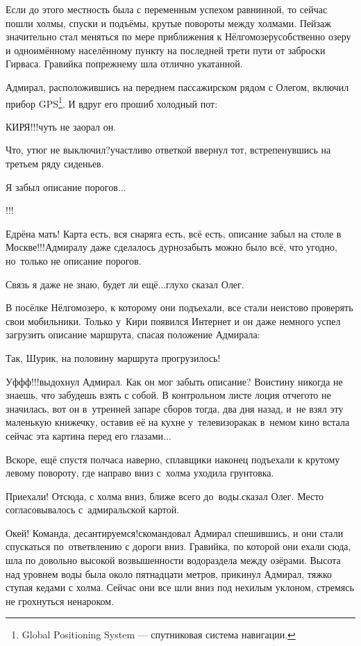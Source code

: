 Если до этого местность была с переменным успехом равнинной, то сейчас пошли холмы, спуски и подъёмы, крутые повороты между холмами. Пейзаж значительно стал меняться по мере приближения к Нёлгомозеру\mdash собственно озеру и одноимённому населённому пункту на последней трети пути от заброски Гирваса. Гравийка по\sdash прежнему шла отлично укатанной.

Адмирал, расположившись на переднем пассажирском рядом с Олегом, включил прибор GPS\footnote{Global Positioning System --- спутниковая система навигации.}. И вдруг его прошиб холодный пот:

\diagdash КИРЯ!!!\mdash чуть не заорал он.

\diagdash Что, утюг не выключил?\mdash участливо ответкой ввернул тот, встрепенувшись на третьем ряду сиденьев.

\diagdash Я забыл описание порогов$\ldots$

\diagdash !!!

\diagdash Едрёна мать! Карта есть, вся снаряга есть, всё есть, описание забыл на столе в Москве!!!\mdash Адмиралу даже сделалось дурно\mdash забыть можно было всё, что угодно, но~только не описание порогов. 

\diagdash Связь я даже не знаю, будет ли ещё$\ldots$\mdash глухо сказал Олег.

В посёлке Нёлгомозеро, к которому они подъехали, все стали неистово проверять свои мобильники. Только у~Кири появился Интернет и он даже немного успел загрузить описание маршрута, спасая положение Адмирала:

\diagdash Так, Шурик, на половину маршрута прогрузилось!

\diagdash Уф\sdash ф\sdash ф!!!\mdash выдохнул Адмирал. Как он мог забыть описание? Воистину никогда не знаешь, что забудешь взять с собой. В контрольном листе лоция отчего\sdash то не значилась, вот он в~утренней запаре сборов тогда, два дня назад, и~не взял эту маленькую книжечку, оставив её на кухне у~телевизора\mdash как в~немом кино встала сейчас эта картина перед его глазами$\ldots$

\newpage
Вскоре, ещё спустя полчаса наверно, сплавщики наконец подъехали к крутому левому повороту, где направо вниз с~холма уходила грунтовка. 

\diagdash Приехали! Отсюда, с холма вниз, ближе всего до~воды.\mdash сказал Олег. Место согласовывалось с~адмиральской картой. 

\diagdash Окей! Команда, десантируемся!\mdash скомандовал Адмирал спешившись, и они стали спускаться по~ответвлению с дороги вниз. Гравийка, по которой они ехали сюда, шла по довольно высокой возвышенности водораздела между озёрами. Высота над уровнем воды была около пятнадцати метров, прикинул Адмирал, тяжко ступая кедами с холма. Сейчас они все шли вниз под нехилым уклоном, стремясь не грохнуться ненароком.

